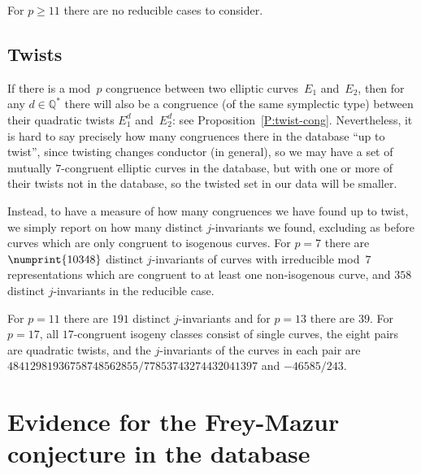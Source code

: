 \documentclass[12pt]{amsart}
\newcommand{\Q}{\mathbb{Q}}
\numberwithin{equation}{section}
\theoremstyle{definition}
\theoremstyle{remark}
\begin{document}
For $p\ge11$ there are no reducible cases to consider.

\subsection{Twists}
If there is a mod~$p$ congruence between two elliptic curves~$E_1$
and~$E_2$, then for any $d\in\Q^*$ there will also be a congruence (of
the same symplectic type) between their quadratic twists $E_1^d$
and~$E_2^d$: see Proposition~\ref{P:twist-cong}.
Nevertheless, it is hard to say precisely how many congruences
there in the database ``up to twist'', since twisting changes
conductor (in general), so we may have a set of mutually $7$-congruent
elliptic curves in the database, but with one or more of their twists
not in the database, so the twisted set in our data will be smaller.

Instead, to have a measure of how many congruences we have found up
to twist, we simply report on how many distinct $j$-invariants we
found, excluding as before curves which are only congruent to
isogenous curves.  For $p=7$ there are $\numprint{10348}$ distinct
$j$-invariants of curves with irreducible mod~$7$ representations
which are congruent to at least one non-isogenous curve, and $358$
distinct $j$-invariants in the reducible case.

For $p=11$ there are $191$ distinct $j$-invariants and for $p=13$
there are $39$.  For $p=17$, all $17$-congruent isogeny classes
consist of single curves, the eight pairs are quadratic twists, and
the $j$-invariants of the curves in each pair are
$48412981936758748562855/77853743274432041397$ and $-46585/243$.





\section{Evidence for the Frey-Mazur conjecture in the database}
\label{S:Frey-Mazur}
\end{document}
